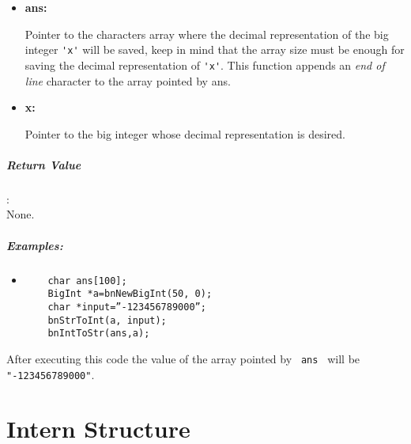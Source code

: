 \documentclass{book}
\begin{document}
\begin{itemize}
\item{\bf ans:}

Pointer to the characters array where the decimal representation of the big integer \verb+'x'+ will be saved, keep in mind that the array size must be enough for saving the decimal representation of \verb+'x'+. This  function appends an \emph{end of line} character to the array pointed by ans.

\item {\bf x:}

Pointer to the big integer whose decimal representation is desired.

\end{itemize}

\paragraph{Return Value}:\\

None.

\paragraph{Examples:}

\begin{itemize}
\item

\begin{verbatim}
	char ans[100];
	BigInt *a=bnNewBigInt(50, 0);
	char *input=”-123456789000”;
	bnStrToInt(a, input);
	bnIntToStr(ans,a);
\end{verbatim}
\end{itemize}

After executing this code the value of the array pointed by \verb+ ans + will be \verb+"-123456789000"+.


\chapter{Intern Structure}
\end{document}
